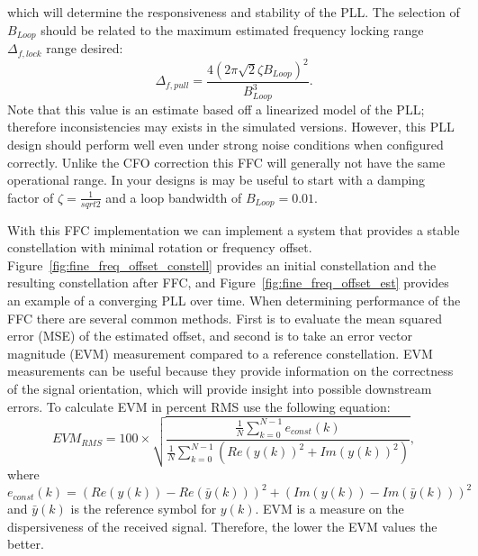 \documentclass[letterpaper,12pt]{article}
\begin{document}
which will determine the responsiveness and stability of the PLL.  The selection of $B_{Loop}$ should be 
related to the maximum estimated frequency locking range $\Delta_{f,lock}$ range desired:
%
\begin{equation}\label{eq:pullin}
\Delta_{f,pull} = \frac{4(2\pi\sqrt{2}\zeta B_{Loop})^2}{B_{Loop}^3}.
\end{equation}
%
Note that this value is an estimate based off a linearized model of the PLL; therefore inconsistencies may 
exists in the simulated versions. However, this PLL design should perform well even under strong noise 
conditions when configured correctly.  Unlike the CFO correction this FFC will generally not have the same 
operational range.  In your designs is may be useful to start with a damping factor of $\zeta = 
\frac{1}{sqrt{2}}$ and a loop bandwidth of $B_{Loop} = 0.01$.\par
%
With this FFC implementation we can implement a system that provides a stable constellation with minimal 
rotation or frequency offset.  Figure~\ref{fig:fine_freq_offset_constell} provides an initial constellation 
and the resulting constellation after FFC, and Figure~\ref{fig:fine_freq_offset_est} provides an example of 
a converging PLL over time. When determining performance of the FFC there are several common 
methods.  First is to evaluate the mean squared error (MSE) of the estimated offset, and second is to take an 
error vector magnitude (EVM) measurement compared to a reference constellation. EVM measurements can be 
useful because they provide information on the correctness of the signal orientation, which will provide 
insight into possible downstream errors. To calculate EVM in percent RMS use the following equation:
%
\begin{equation}
  EVM_{RMS} = 100\times\sqrt{\frac{\frac{1}{N}\sum_{k=0}^{N-1} e_{const}(k) }{\frac{1}{N}\sum_{k=0}^{N-1} 
(Re(y(k))^2 + Im(y(k))^2) }},
\end{equation}
%
where
\begin{equation}
 e_{const}(k) = (Re(y(k)) - Re(\bar{y}(k)))^2 + (Im(y(k)) - Im(\bar{y}(k)))^2
\end{equation}
and $\bar{y}(k)$ is the reference symbol for $y(k)$.  EVM is a measure on the dispersiveness of the received signal.  Therefore, the lower the EVM values the better.
\end{document}

